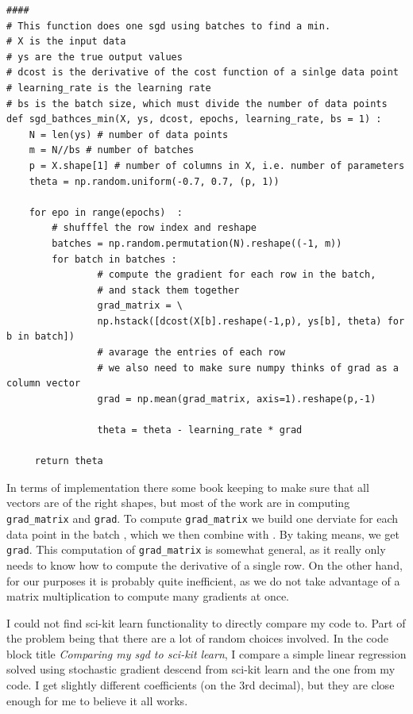 \documentclass[parskip=half]{scrartcl}
\theoremstyle{definition}
\theoremstyle{remark}
\newcommand{\funcname}[1]{{\color{blue}{\texttt{#1}}}}
\newcommand{\varname}[1]{\texttt{#1}}
\begin{document}
\begin{verbatim}
####
# This function does one sgd using batches to find a min.
# X is the input data
# ys are the true output values
# dcost is the derivative of the cost function of a sinlge data point
# learning_rate is the learning rate
# bs is the batch size, which must divide the number of data points
def sgd_bathces_min(X, ys, dcost, epochs, learning_rate, bs = 1) :
    N = len(ys) # number of data points
    m = N//bs # number of batches
    p = X.shape[1] # number of columns in X, i.e. number of parameters
    theta = np.random.uniform(-0.7, 0.7, (p, 1)) 
    
    for epo in range(epochs)  :
        # shufffel the row index and reshape
        batches = np.random.permutation(N).reshape((-1, m)) 
        for batch in batches :
                # compute the gradient for each row in the batch, 
                # and stack them together
                grad_matrix = \
                np.hstack([dcost(X[b].reshape(-1,p), ys[b], theta) for b in batch])
                # avarage the entries of each row 
                # we also need to make sure numpy thinks of grad as a column vector
                grad = np.mean(grad_matrix, axis=1).reshape(p,-1)

                theta = theta - learning_rate * grad
        
     return theta
\end{verbatim}

In terms of implementation there some book keeping to make sure that all vectors are of the right shapes, but most of the work are in computing \varname{grad\_matrix} and \varname{grad}. 
To compute \varname{grad\_matrix} we build one derviate for each data point in the batch , which we then combine with \funcname{np.hstack}. 
By taking means, we get \varname{grad}. 
This computation of \varname{grad\_matrix} is somewhat general, as it really only needs to know how to compute the derivative of a single row. 
On the other hand, for our purposes it is probably quite inefficient, as we do not take advantage of a matrix multiplication to compute many gradients at once.  

I could not find sci-kit learn functionality to directly compare my code to. 
Part of the problem being that there are a lot of random choices involved.
In the code block title \emph{Comparing my sgd to sci-kit learn}, I compare a simple linear regression solved using stochastic gradient descend from sci-kit learn and the one from my code. 
I get slightly different coefficients (on the 3rd decimal), but they are close enough for me to believe it all works.  
\end{document}
